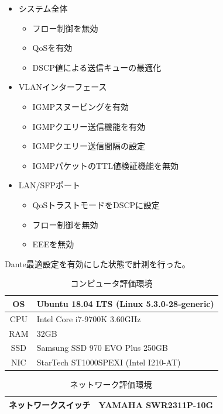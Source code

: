 \begin{itemize}
  \item システム全体
  \begin{itemize}
    \item フロー制御を無効
    \item QoSを有効
    \item DSCP値による送信キューの最適化
  \end{itemize}
  \item VLANインターフェース
  \begin{itemize}
    \item IGMPスヌーピングを有効
    \item IGMPクエリー送信機能を有効
    \item IGMPクエリー送信間隔の設定
    \item IGMPパケットのTTL値検証機能を無効
  \end{itemize}
  \item LAN/SFPポート
  \begin{itemize}
    \item QoSトラストモードをDSCPに設定
    \item フロー制御を無効
    \item EEEを無効
  \end{itemize}
\end{itemize}

Dante最適設定を有効にした状態で計測を行った。

\begin{table}[tbp]
  \caption{コンピュータ評価環境}
  \label{tab:evaluation_computer}
  \centering
  \begin{tabular}{c|l} \hline
    OS & Ubuntu 18.04 LTS (Linux 5.3.0-28-generic)\\ \hline
    CPU & Intel Core i7-9700K 3.60GHz \\ \hline
    RAM & 32GB \\ \hline
    SSD & Samsung SSD 970 EVO Plus 250GB \\ \hline
    NIC & StarTech ST1000SPEXI (Intel I210-AT) \\ \hline
  \end{tabular}
\end{table}

\begin{table}[tbp]
  \caption{ネットワーク評価環境}
  \label{tab:evaluation_network}
  \centering
  \begin{tabular}{c|l} \hline
    ネットワークスイッチ & YAMAHA SWR2311P-10G \\ \hline
  \end{tabular}
\end{table}

